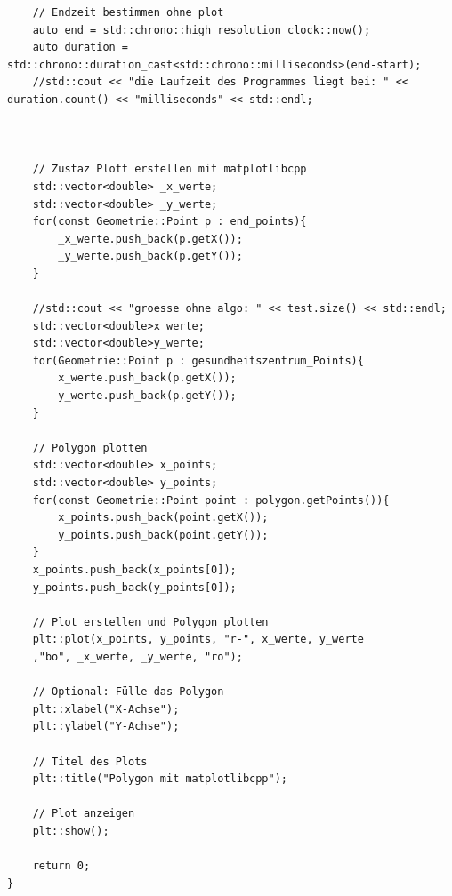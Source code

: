 \documentclass{article}
\begin{document}
\begin{verbatim}
	// Endzeit bestimmen ohne plot
	auto end = std::chrono::high_resolution_clock::now();
	auto duration = std::chrono::duration_cast<std::chrono::milliseconds>(end-start);
	//std::cout << "die Laufzeit des Programmes liegt bei: " << duration.count() << "milliseconds" << std::endl;



	// Zustaz Plott erstellen mit matplotlibcpp
	std::vector<double> _x_werte;
	std::vector<double> _y_werte;
	for(const Geometrie::Point p : end_points){
		_x_werte.push_back(p.getX());
		_y_werte.push_back(p.getY());
	}

	//std::cout << "groesse ohne algo: " << test.size() << std::endl;
	std::vector<double>x_werte;
	std::vector<double>y_werte;
	for(Geometrie::Point p : gesundheitszentrum_Points){
		x_werte.push_back(p.getX());
		y_werte.push_back(p.getY());
	}

	// Polygon plotten
	std::vector<double> x_points;
	std::vector<double> y_points;
	for(const Geometrie::Point point : polygon.getPoints()){
		x_points.push_back(point.getX());
		y_points.push_back(point.getY());
	}
	x_points.push_back(x_points[0]);
	y_points.push_back(y_points[0]);

	// Plot erstellen und Polygon plotten
	plt::plot(x_points, y_points, "r-", x_werte, y_werte
	,"bo", _x_werte, _y_werte, "ro");

	// Optional: Fülle das Polygon
	plt::xlabel("X-Achse");
	plt::ylabel("Y-Achse");

	// Titel des Plots
	plt::title("Polygon mit matplotlibcpp");

	// Plot anzeigen
	plt::show();

	return 0;
}
\end{verbatim}
\end{document}
